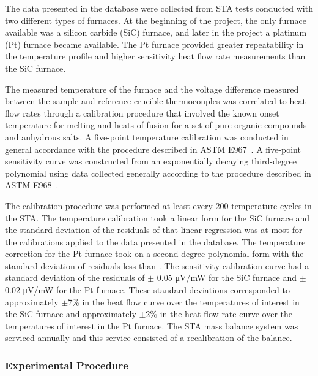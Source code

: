 \documentclass[12pt,oneside]{book}
\begin{document}
The data presented in the database were collected from STA tests conducted with two different types of furnaces. At the beginning of the project, the only furnace available was a silicon carbide (SiC) furnace, and later in the project a platinum (Pt) furnace became available. The Pt furnace provided greater repeatability in the temperature profile and higher sensitivity heat flow rate measurements than the SiC furnace. 

The measured temperature of the furnace and the voltage difference measured between the sample and reference crucible thermocouples was correlated to heat flow rates through a calibration procedure that involved the known onset temperature for melting and heats of fusion for a set of pure organic compounds and anhydrous salts. A five-point temperature calibration was conducted in general accordance with the procedure described in ASTM E967~\cite{ASTM_E967}. A five-point sensitivity curve was constructed from an exponentially decaying third-degree polynomial using data collected generally according to the procedure described in ASTM E968~\cite{ASTM_E968}. 

The calibration procedure was performed at least every 200 temperature cycles in the STA. The temperature calibration took a linear form for the SiC furnace and the standard deviation of the residuals of that linear regression was at most  for the calibrations applied to the data presented in the database. The temperature correction for the Pt furnace took on a second-degree polynomial form with the standard deviation of residuals less than . The sensitivity calibration curve had a standard deviation of the residuals of $\pm$ 0.05 \si{\micro V/mW} for the SiC furnace and $\pm$ 0.02 \si{\micro V/mW} for the Pt furnace. These standard deviations corresponded to approximately $\pm$7\% in the heat flow curve over the temperatures of interest in the SiC furnace and approximately $\pm$2\% in the heat flow rate curve over the temperatures of interest in the Pt furnace. The STA mass balance system was serviced annually and this service consisted of a recalibration of the balance. 

\subsubsection{Experimental Procedure}
\end{document}
